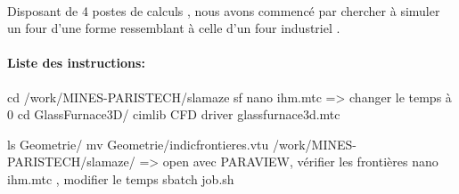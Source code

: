\documentclass[12pt, a4paper, french, BCOR = 0pt, DIV = 10]{scrartcl}
\begin{document}
	\paragraph{}
	 Disposant de 4 postes de calculs , nous avons commencé par chercher à simuler un four  d'une forme ressemblant à celle d'un four industriel .
	 
	 \paragraph{Liste des instructions:}
	 cd /work/MINES-PARISTECH/slamaze
	 sf
	 nano ihm.mtc => changer le temps à 0
	 cd GlassFurnace3D/
	 cimlib CFD driver glassfurnace3d.mtc
	 
	 ls Geometrie/
	 mv Geometrie/indicfrontieres.vtu /work/MINES-PARISTECH/slamaze/ => open avec PARAVIEW, vérifier les frontières
	 nano ihm.mtc , modifier le temps
	 sbatch job.sh
	 
 
	
	
\end{document}
